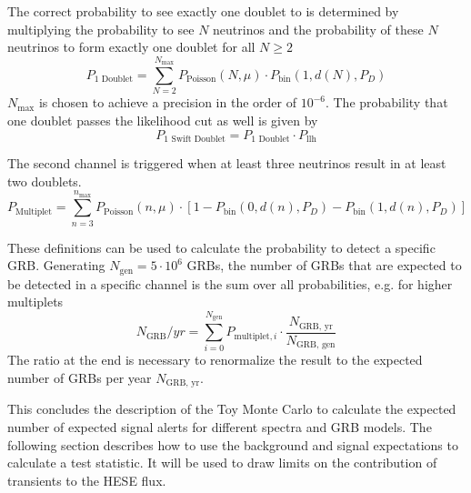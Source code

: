 The correct probability to see exactly one doublet to is determined by 
multiplying the probability to see $N$ neutrinos and the probability of these 
$N$ 
neutrinos to form exactly one doublet for all $N \geq 2$
\begin{equation}
 P_\text{1 Doublet} = \sum_{N=2}^{N_\text{max}} P_\text{Poisson}(N, 
\mu) \cdot P_\text{bin} (1, d(N), P_D)
\end{equation}
$N_\text{max}$ is chosen to achieve a precision in the order of $10^{-6}$.
The probability that one doublet passes the likelihood cut as well is given by
\begin{equation}
 P_\text{1 Swift Doublet} = P_\text{1 Doublet} \cdot P_\text{llh}
\end{equation}

The second channel is triggered when at least three neutrinos 
result in at least two doublets.
\begin{equation}
 P_\text{Multiplet} = \sum_{n=3}^{n_\text{max}} P_\text{Poisson}(n, 
\mu) \cdot [1 - P_\text{bin} (0, d(n), P_D) - P_\text{bin} (1, 
d(n), P_D)]
\end{equation}

These definitions can be used to calculate the probability to detect a specific 
GRB. Generating $N_\text{gen} = 5\cdot10^6$ GRBs, the number of GRBs that are 
expected to be detected
in a specific channel is the sum over all probabilities, e.g. for higher 
multiplets
\begin{equation}
 N_\text{GRB} / yr = \sum_{i=0}^{N_\text{gen}} P_{\text{multiplet},i} \cdot 
\frac{N_\text{GRB, yr}}{N_\text{GRB, gen}}
\end{equation}
The ratio at the end is necessary to renormalize the result to the expected 
number of 
GRBs per year $N_\text{GRB, yr}$.

This concludes the description of the Toy Monte Carlo to calculate the expected 
number of expected signal alerts for different spectra and GRB models. The 
following section describes how to use the background and signal expectations 
 to calculate a test statistic. It will be used to draw limits on the 
contribution of transients to the HESE flux.
